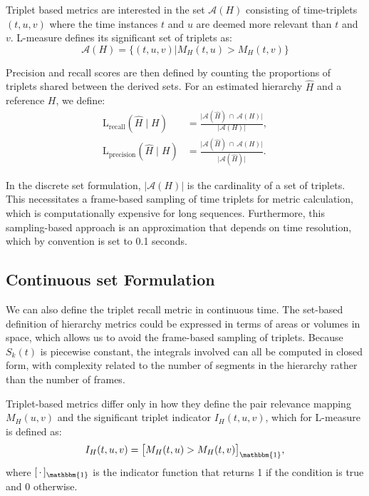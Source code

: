 
Triplet based metrics are interested in the set \(\mathcal{A}(H)\) consisting of time-triplets \((t,u,v)\) where the time instances $t$ and $u$ are deemed more relevant than $t$ and $v$.
L-measure defines its significant set of triplets as:
\begin{equation}
    \mathcal{A}(H) = \{(t,u,v)|M_H(t,u) > M_H(t,v)\}
\end{equation}

Precision and recall scores are then defined by counting the proportions of triplets shared between the derived sets.
For an estimated hierarchy $\hat{H}$ and a reference $H$, we define:
\begin{align}
\mathrm{L}_{\mathrm{recall}}(\hat{H} \mid H )
&= \frac{\bigl|\mathcal{A}(\hat{H}) \,\cap\, \mathcal{A}(H)\bigr|}
    {\bigl|\mathcal{A}(H)\bigr|}, \nonumber \\
\mathrm{L}_{\mathrm{precision}}(\hat{H} \mid H ) \label{eq:lmeasure}
&= \frac{\bigl|\mathcal{A}(\hat{H}) \,\cap\, \mathcal{A}(H)\bigr|}
    {\bigl|\mathcal{A}(\hat{H})\bigr|}.
\end{align}

In the discrete set formulation, $|\mathcal{A}(H)|$ is the cardinality of a set of triplets. 
This necessitates a frame-based sampling of time triplets for metric calculation, which is computationally expensive for long sequences.
Furthermore, this sampling-based approach is an approximation that depends on time resolution, which by convention is set to 0.1 seconds.

 
\subsection{Continuous set Formulation}
We can also define the triplet recall metric in continuous time.
The set-based definition of hierarchy metrics could be expressed in terms of areas or volumes in space, which allows us to avoid the frame-based sampling of triplets.
Because $S_k(t)$ is piecewise constant, the integrals involved can all be computed in closed form, with complexity related to the number of segments in the hierarchy rather than the number of frames.

Triplet-based metrics differ only in how they define the pair relevance mapping \(M_H(u,v)\) and the significant triplet indicator \(I_H(t,u,v)\), which for L-measure is defined as:
\begin{equation}
    I_H(t,u,v) = \big[M_H(t,u) > M_H(t,v)\big]_{\mathbbm{1}}, 
    \label{eq:significant_triplet}
\end{equation}
where \([\,\cdot\,]_{\mathbbm{1}}\) is the indicator function that returns 1 if the condition is true and 0 otherwise.

